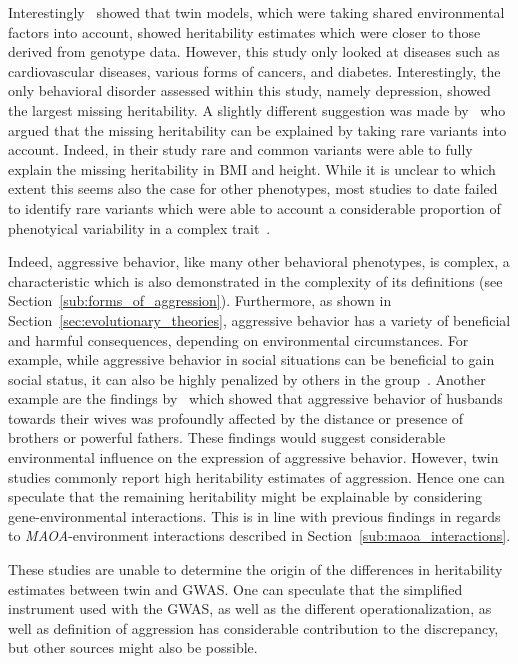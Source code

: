 Interestingly~\citet{Munoz2016a} showed that twin models, which were taking shared environmental factors into account, showed heritability estimates which were closer to those derived from genotype data.
However, this study only looked at diseases such as cardiovascular diseases, various forms of cancers, and diabetes.
Interestingly, the only behavioral  disorder assessed within this study, namely depression, showed the largest missing heritability.
A slightly different suggestion was made by~\citet{Yang2015} who argued that the missing heritability can be explained by taking rare variants into account.
Indeed, in their study rare and common variants were able to fully explain the missing heritability in BMI and height.
While it is unclear to which extent this seems also the case for other phenotypes, most studies to date failed to identify rare variants which were able to account a considerable proportion of phenotyical variability in a complex trait~\cite{Chabris2015,Wray2011}.

Indeed, aggressive behavior, like many other behavioral phenotypes, is complex,
a characteristic which is also demonstrated in the complexity of its definitions (see Section~\ref{sub:forms_of_aggression}).
Furthermore, as shown in Section~\ref{sec:evolutionary_theories}, aggressive behavior has a variety of beneficial and harmful consequences, depending on environmental circumstances. 
For example, while aggressive behavior in social situations can be beneficial to gain social status, it can also be highly penalized by others in the group~\cite{Buss1997}.
Another example are the findings by~\citet{Figueredo1995} which showed that aggressive behavior of husbands towards their wives was profoundly affected by the distance or presence of brothers or powerful fathers.
These findings would suggest considerable environmental influence on the expression of aggressive behavior.
However, twin studies commonly report high heritability estimates of aggression.
Hence one can speculate that the remaining heritability might be explainable by considering gene-environmental interactions.
This is in line with previous findings in regards to \textit{MAOA}-environment interactions described in Section~\ref{sub:maoa_interactions}.

These studies are unable to determine the origin of the differences in heritability estimates between twin and GWAS\@.
One can speculate that the simplified instrument used with the GWAS, as well as the different operationalization, as well as definition of aggression has considerable contribution to the discrepancy, but other sources might also be possible.


